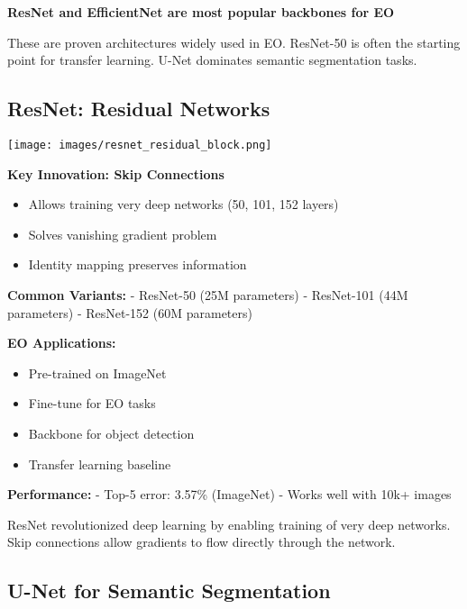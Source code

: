\documentclass[
  letterpaper,
  DIV=11,
  numbers=noendperiod]{scrartcl}
\providecommand{\tightlist}{%
  \setlength{\itemsep}{0pt}\setlength{\parskip}{0pt}}
\begin{document}
\textbf{ResNet and EfficientNet are most popular backbones for EO}

These are proven architectures widely used in EO. ResNet-50 is often the
starting point for transfer learning. U-Net dominates semantic
segmentation tasks.

\subsection{ResNet: Residual Networks}\label{resnet-residual-networks}

\begin{center}
\texttt{[image: images/resnet\_residual\_block.png]}
\end{center}

\textbf{Key Innovation: Skip Connections}

\begin{itemize}
\tightlist
\item
  Allows training very deep networks (50, 101, 152 layers)
\item
  Solves vanishing gradient problem
\item
  Identity mapping preserves information
\end{itemize}

\textbf{Common Variants:} - ResNet-50 (25M parameters) - ResNet-101 (44M
parameters) - ResNet-152 (60M parameters)

\textbf{EO Applications:}

\begin{itemize}
\tightlist
\item
  Pre-trained on ImageNet
\item
  Fine-tune for EO tasks
\item
  Backbone for object detection
\item
  Transfer learning baseline
\end{itemize}

\textbf{Performance:} - Top-5 error: 3.57\% (ImageNet) - Works well with
10k+ images

ResNet revolutionized deep learning by enabling training of very deep
networks. Skip connections allow gradients to flow directly through the
network.

\subsection{U-Net for Semantic
Segmentation}\label{u-net-for-semantic-segmentation}
\end{document}
